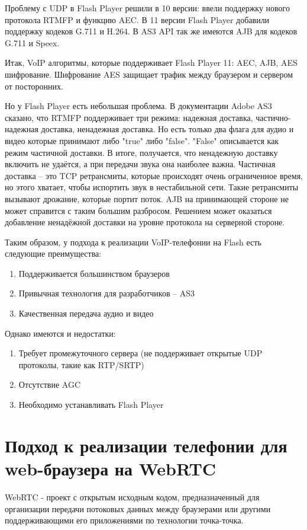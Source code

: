 Проблему с UDP в Flash Player решили в 10 версии: ввели поддержку нового протокола RTMFP и функцию AEC. В 11 версии Flash Player добавили поддержку кодеков G.711 и H.264. В AS3 API так же имеются AJB для кодеков G.711 и Speex.

Итак, VoIP алгоритмы, которые поддерживает Flash Player 11: AEC, AJB, AES шифрование. Шифрование AES защищает трафик между браузером и сервером от посторонних.

Но у Flash Player есть небольшая проблема. В документации Adobe AS3 сказано, что RTMFP поддерживает три режима: надежная доставка, частично-надежная доставка, ненадежная доставка. Но есть только два флага для аудио и видео которые принимают либо "true" либо "false". "False" описывается как режим частичной доставки. В итоге, получается, что ненадежную доставку включить не удаётся, а при передачи звука она наиболее важна. Частичная доставка – это TCP ретрансмиты, которые происходят очень ограниченное время, но этого хватает, чтобы испортить звук в нестабильной сети. Такие ретрансмиты вызывают дрожание, которые портит поток. AJB на принимающей стороне не может справится с таким большим разбросом. Решением может оказаться добавление ненадёжной доставки на уровне протокола на серверной стороне.

Таким образом, у подхода к реализации VoIP-телефонии на Flash есть следующие преимущества:
\begin{enumerate}
\item Поддерживается большинством браузеров
\item Привычная технология для разработчиков – AS3
\item Качественная передача аудио и видео
\end{enumerate}

Однако имеются и недостатки:
\begin{enumerate}
\item Требует промежуточного сервера (не поддерживает открытые UDP протоколы, такие как RTP/SRTP)
\item Отсутствие AGC
\item Необходимо устанавливать Flash Player
\end{enumerate}

\section{Подход к реализации телефонии для web-браузера на WebRTC}

WebRTC - проект с открытым исходным кодом, предназначенный для организации передачи потоковых данных между браузерами или другими поддерживающими его приложениями по технологии точка-точка.\cite{WebRTC}

